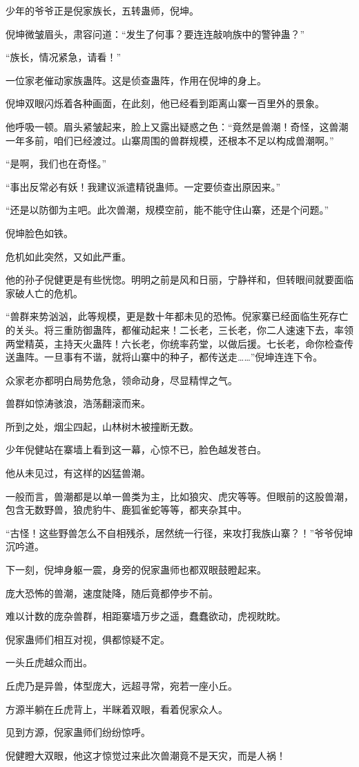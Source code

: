 \begin{this_body}
少年的爷爷正是倪家族长，五转蛊师，倪坤。

倪坤微皱眉头，肃容问道：“发生了何事？要连连敲响族中的警钟蛊？”

“族长，情况紧急，请看！”

一位家老催动家族蛊阵。这是侦查蛊阵，作用在倪坤的身上。

倪坤双眼闪烁着各种画面，在此刻，他已经看到距离山寨一百里外的景象。

他呼吸一顿。眉头紧皱起来，脸上又露出疑惑之色：“竟然是兽潮！奇怪，这兽潮一年多前，咱们已经渡过。山寨周围的兽群规模，还根本不足以构成兽潮啊。”

“是啊，我们也在奇怪。”

“事出反常必有妖！我建议派遣精锐蛊师。一定要侦查出原因来。”

“还是以防御为主吧。此次兽潮，规模空前，能不能守住山寨，还是个问题。”

倪坤脸色如铁。

危机如此突然，又如此严重。

他的孙子倪健更是有些恍惚。明明之前是风和日丽，宁静祥和，但转眼间就要面临家破人亡的危机。

“兽群来势汹汹，此等规模，更是数十年都未见的恐怖。倪家寨已经面临生死存亡的关头。将三重防御蛊阵，都催动起来！二长老，三长老，你二人速速下去，率领两堂精英，主持天火蛊阵！六长老，你统率药堂，以做后援。七长老，命你检查传送蛊阵。一旦事有不谐，就将山寨中的种子，都传送走……”倪坤连连下令。

众家老亦都明白局势危急，领命动身，尽显精悍之气。

兽群如惊涛骇浪，浩荡翻滚而来。

所到之处，烟尘四起，山林树木被撞断无数。

少年倪健站在寨墙上看到这一幕，心惊不已，脸色越发苍白。

他从未见过，有这样的凶猛兽潮。

一般而言，兽潮都是以单一兽类为主，比如狼灾、虎灾等等。但眼前的这股兽潮，包含无数野兽，狼虎豹牛、鹿狐雀蛇等等，都夹杂其中。

“古怪！这些野兽怎么不自相残杀，居然统一行径，来攻打我族山寨？！”爷爷倪坤沉吟道。

下一刻，倪坤身躯一震，身旁的倪家蛊师也都双眼鼓瞪起来。

庞大恐怖的兽潮，速度陡降，随后竟都停步不前。

难以计数的庞杂兽群，相距寨墙万步之遥，蠢蠢欲动，虎视眈眈。

倪家蛊师们相互对视，俱都惊疑不定。

一头丘虎越众而出。

丘虎乃是异兽，体型庞大，远超寻常，宛若一座小丘。

方源半躺在丘虎背上，半眯着双眼，看着倪家众人。

见到方源，倪家蛊师们纷纷惊呼。

倪健瞪大双眼，他这才惊觉过来此次兽潮竟不是天灾，而是人祸！

\end{this_body}

